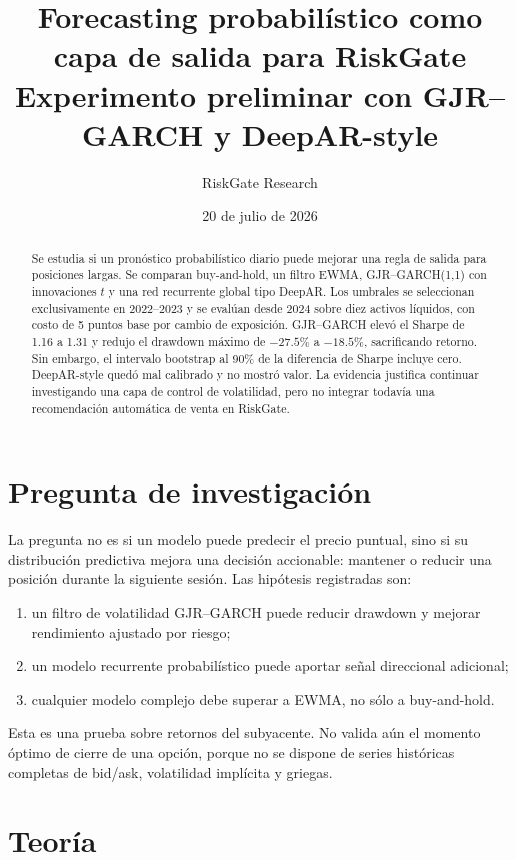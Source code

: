 \documentclass[11pt]{article}
\title{Forecasting probabilístico como capa de salida para RiskGate\\\large Experimento preliminar con GJR--GARCH y DeepAR-style}
\author{RiskGate Research}
\date{20 de julio de 2026}
\begin{document}
\maketitle

\begin{abstract}
Se estudia si un pronóstico probabilístico diario puede mejorar una regla de salida para posiciones largas.
Se comparan buy-and-hold, un filtro EWMA, GJR--GARCH(1,1) con innovaciones $t$ y una red recurrente global
tipo DeepAR. Los umbrales se seleccionan exclusivamente en 2022--2023 y se evalúan desde 2024 sobre diez
activos líquidos, con costo de 5 puntos base por cambio de exposición. GJR--GARCH elevó el Sharpe de 1.16 a
1.31 y redujo el drawdown máximo de $-27.5\%$ a $-18.5\%$, sacrificando retorno. Sin embargo, el intervalo
bootstrap al 90\% de la diferencia de Sharpe incluye cero. DeepAR-style quedó mal calibrado y no mostró valor.
La evidencia justifica continuar investigando una capa de control de volatilidad, pero no integrar todavía una
recomendación automática de venta en RiskGate.
\end{abstract}

\section{Pregunta de investigación}
La pregunta no es si un modelo puede predecir el precio puntual, sino si su distribución predictiva mejora una
decisión accionable: mantener o reducir una posición durante la siguiente sesión. Las hipótesis registradas son:
\begin{enumerate}
  \item un filtro de volatilidad GJR--GARCH puede reducir drawdown y mejorar rendimiento ajustado por riesgo;
  \item un modelo recurrente probabilístico puede aportar señal direccional adicional;
  \item cualquier modelo complejo debe superar a EWMA, no sólo a buy-and-hold.
\end{enumerate}
Esta es una prueba sobre retornos del subyacente. No valida aún el momento óptimo de cierre de una opción,
porque no se dispone de series históricas completas de bid/ask, volatilidad implícita y griegas.

\section{Teoría}
\end{document}
